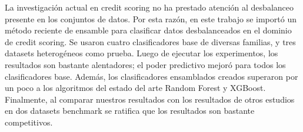 \begin{resumen}
La investigación actual en credit scoring no ha prestado atención al desbalanceo presente en los conjuntos de datos. Por esta razón, en este trabajo se importó un método reciente de ensamble para clasificar datos desbalanceados en el dominio de credit scoring. Se usaron cuatro clasificadores base de diversas familias, y tres datasets heterogéneos como prueba. Luego de ejecutar los experimentos, los resultados son bastante alentadores; el poder predictivo mejoró para todos los clasificadores base. Además, los clasificadores ensamblados creados superaron por un poco a los algoritmos del estado del arte Random Forest y XGBoost. Finalmente, al comparar nuestros resultados con los resultados de otros estudios en dos datasets benchmark se ratifica que los resultados son bastante competitivos.
\end{resumen}
